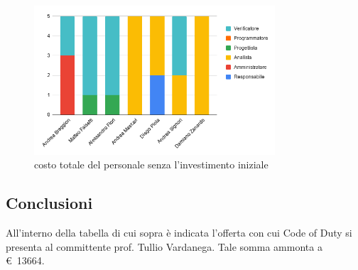         \def\salarycontent{
            {Amministratore,54,20,1080},
            {Analista,41,25,1025},
            {Progettista,192,22,4224},
            {Programmatore,211,15,3165},
            {Responsabile,41,30,1230},
            {Verificatore,196,15,2940},
            {Totale,735,127,13664},
        }
        
        \begin{figure}[H]
            \centering
            \includegraphics[width=0.8\textwidth]{source/img/consolidamento_orari.png}
            \caption{costo totale del personale senza l'investimento iniziale}
        \end{figure}
    \subsection{Conclusioni}
    All'interno della tabella di cui sopra è indicata l'offerta con cui Code of Duty si presenta al committente prof. Tullio Vardanega. Tale somma ammonta a \euro\ 13664.